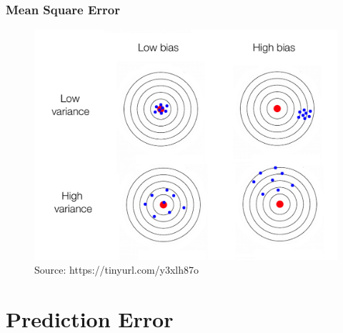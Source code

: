 \documentclass[
  shownotes,
  xcolor={svgnames},
  hyperref={colorlinks,citecolor=DarkBlue,linkcolor=DarkRed,urlcolor=DarkBlue}
  ]{beamer}
\begin{document}
\begin{frame}
\frametitle{Mean Square Error}


\begin{figure}[H] \centering
  \centering
  \includegraphics[scale=0.15]{figures/medium_bias_variance.png}
  \\
  \tiny
  Source: https://tinyurl.com/y3xlh87o
\end{figure}


\end{frame}

\section{Prediction Error}
\end{document}
